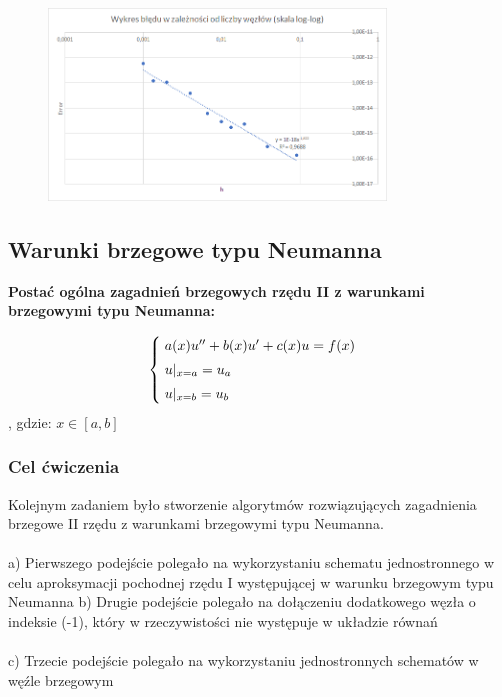 \begin{samepage}
    
    \begin{figure}[!ht]
        \begin{center}
            \includegraphics[width=0.8\textwidth]{Lab4/charts/zad3/error.png}
        \end{center}
    \end{figure}
    \FloatBarrier
\end{samepage}   
    
    

\subsection{Warunki brzegowe typu Neumanna}
\textbf{Postać ogólna zagadnień brzegowych rzędu II z warunkami brzegowymi typu Neumanna:}

\[
\begin{cases}
\vspace{0.1cm} 
\hspace{0,1cm} a(x) u'' + b(x)u' + c(x)u =f(x) \\
\vspace{0.1cm}
\hspace{0,1cm}u|_{x=a} = u_{a} \\
\hspace{0,1cm}u|_{x=b} = u_{b}
\end{cases}
\]
, gdzie:
$x\in[a,b]$
\\

\subsubsection{Cel ćwiczenia}
Kolejnym zadaniem było stworzenie algorytmów rozwiązujących zagadnienia brzegowe II rzędu z warunkami brzegowymi typu Neumanna.
\\\\
a) Pierwszego podejście polegało na wykorzystaniu schematu jednostronnego w celu aproksymacji pochodnej rzędu I występującej w warunku brzegowym typu Neumanna
\newpage
b) Drugie podejście polegało na dołączeniu dodatkowego węzła o indeksie (-1), który w rzeczywistości nie występuje w układzie równań
\\\\
c) Trzecie podejście polegało na wykorzystaniu jednostronnych schematów w węźle brzegowym

